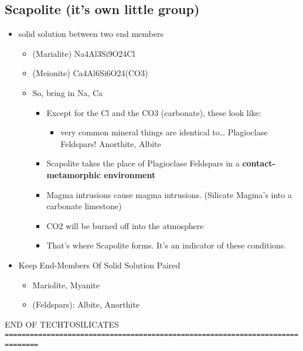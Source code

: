 \documentclass[11pt]{article}
\begin{document}
\subsection{Scapolite (it's own little group)}
\label{sec-2-3}
\begin{itemize}
\item solid solution between two end members
\begin{itemize}
\item (Marialite) Na4Al3Si9O24Cl
\item (Meionite) Ca4Al6Si6O24(CO3)
\item So, bring in Na, Ca
\begin{itemize}
\item Except for the Cl and the CO3 (carbonate), these look like:
\begin{itemize}
\item very common mineral things are identical to\ldots{} Plagioclase Feldspars! Anorthite, Albite
\end{itemize}
\item Scapolite takes the place of Plagioclase Feldspars in a \textbf{contact-metamorphic environment}
\item Magma intrusions cause magma intrusions. (Silicate Magma's into a carbonate limestone)
\item CO2 will be burned off into the atmosphere
\item That's where Scapolite forms. It's an indicator of these conditions.
\end{itemize}
\end{itemize}
\item Keep End-Members Of Solid Solution Paired
\begin{itemize}
\item Mariolite, Myanite
\item (Feldspars): Albite, Anorthite
\end{itemize}
\end{itemize}
END OF TECHTOSILICATES
\texttt{==============================================================================}
\end{document}
